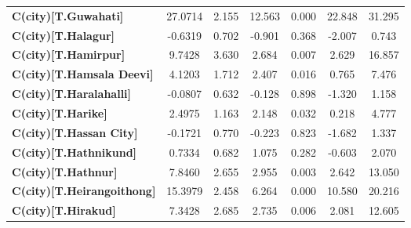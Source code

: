 \begin{center}
\begin{tabular}{lcccccc}
\textbf{C(city)[T.Guwahati]}                                                                        &      27.0714  &        2.155     &    12.563  &         0.000        &       22.848    &       31.295     \\
\textbf{C(city)[T.Halagur]}                                                                         &      -0.6319  &        0.702     &    -0.901  &         0.368        &       -2.007    &        0.743     \\
\textbf{C(city)[T.Hamirpur]}                                                                        &       9.7428  &        3.630     &     2.684  &         0.007        &        2.629    &       16.857     \\
\textbf{C(city)[T.Hamsala Deevi]}                                                                   &       4.1203  &        1.712     &     2.407  &         0.016        &        0.765    &        7.476     \\
\textbf{C(city)[T.Haralahalli]}                                                                     &      -0.0807  &        0.632     &    -0.128  &         0.898        &       -1.320    &        1.158     \\
\textbf{C(city)[T.Harike]}                                                                          &       2.4975  &        1.163     &     2.148  &         0.032        &        0.218    &        4.777     \\
\textbf{C(city)[T.Hassan City]}                                                                     &      -0.1721  &        0.770     &    -0.223  &         0.823        &       -1.682    &        1.337     \\
\textbf{C(city)[T.Hathnikund]}                                                                      &       0.7334  &        0.682     &     1.075  &         0.282        &       -0.603    &        2.070     \\
\textbf{C(city)[T.Hathnur]}                                                                         &       7.8460  &        2.655     &     2.955  &         0.003        &        2.642    &       13.050     \\
\textbf{C(city)[T.Heirangoithong]}                                                                  &      15.3979  &        2.458     &     6.264  &         0.000        &       10.580    &       20.216     \\
\textbf{C(city)[T.Hirakud]}                                                                         &       7.3428  &        2.685     &     2.735  &         0.006        &        2.081    &       12.605     \\

\end{tabular}
\end{center}
